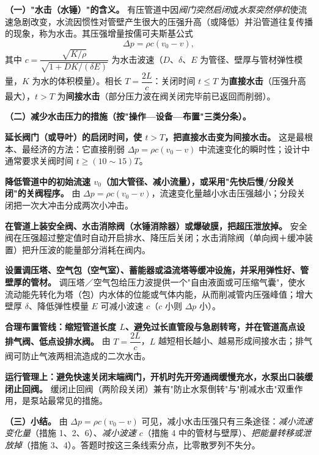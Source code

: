 \begin{jie}
\textbf{（一）"水击（水锤）"的含义。} 有压管道中因\emph{阀门突然启闭}或\emph{水泵突然停机}使流速急剧改变，水流因惯性对管壁产生很大的压强升高（或降低）并沿管道往复传播的现象，称为水击。其压强增量按儒可夫斯基公式
\[\Delta p=\rho c(v_0-v),\]
其中 $c=\dfrac{\sqrt{K/\rho}}{\sqrt{1+DK/(\delta E)}}$ 为水击波速（$D$、$\delta$、$E$ 为管径、壁厚与管材弹性模量，$K$ 为水的体积模量）。相长 $T=\dfrac{2L}{c}$：关闭时间 $t\le T$ 为\textbf{直接水击}（压强升高最大），$t>T$ 为\textbf{间接水击}（部分压力波在阀关闭完毕前已返回而削弱）。

\textbf{（二）减少水击压力的措施（按"操作—设备—布置"三类分条）。}
\begin{xiaowen}
\item \textbf{延长阀门（或导叶）的启闭时间，使 $t>T$，把直接水击变为间接水击。} 这是最根本、最经济的方法：它直接削弱 $\Delta p=\rho c(v_0-v)$ 中流速变化的瞬时性；设计中通常要求关阀时间 $t\ge(10\sim15)T$。
\item \textbf{降低管道中的初始流速 $v_0$（加大管径、减小流量），或采用"先快后慢/分段关闭"的关阀程序。} 由 $\Delta p=\rho c(v_0-v)$，流速变化量越小水击压强越小；分段关闭把一次大冲击分成两次小冲击。
\item \textbf{在管道上装安全阀、水击消除阀（水锤消除器）或爆破膜，把超压泄放掉。} 安全阀在压强超过整定值时自动开启排水、降压后关闭；水击消除阀（单向阀＋缓冲装置）把升压波的能量部分消耗在阀内。
\item \textbf{设置调压塔、空气包（空气室）、蓄能器或溢流塔等缓冲设施，并采用弹性好、管壁厚的管材。} 调压塔／空气包给压力波提供一个"自由液面或可压缩气囊"，使水流动能先转化为塔（包）内水体的位能或气体内能，从而削减管内压强峰值；增大壁厚 $\delta$、降低弹性模量 $E$ 可减小波速 $c$（$c$ 小则 $\Delta p$ 小）。
\item \textbf{合理布置管线：缩短管道长度 $L$、避免过长直管段与急剧转弯，并在管道高点设排气阀、低点设排水阀。} 由 $T=\dfrac{2L}{c}$，$L$ 越短相长越小、越易形成间接水击；排气阀可防止气液两相流造成的二次水击。
\item \textbf{运行管理上：避免快速关闭末端阀门，开机时先开旁通阀缓慢充水，水泵出口装缓闭止回阀。} 缓闭止回阀（两阶段关闭）兼有"防止水泵倒转"与"削减水击"双重作用，是泵站最常见的措施。
\end{xiaowen}

\textbf{（三）小结。} 由 $\Delta p=\rho c(v_0-v)$ 可见，减小水击压强只有三条途径：\emph{减小流速变化量}（措施 1、2、6）、\emph{减小波速 $c$}（措施 4 中的管材与壁厚）、\emph{把能量转移或泄放掉}（措施 3、4）。答题时按这三条线索分点，比零散罗列不失分。
\end{jie}
